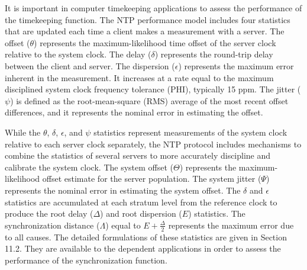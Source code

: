 It is important in computer timekeeping applications to assess the
performance of the timekeeping function. The NTP performance model
includes four statistics that are updated each time a client makes a
measurement with a server. The offset ($ \theta $) represents the
maximum-likelihood time offset of the server clock relative to the
system clock. The delay ($ \delta $) represents the round-trip delay
between the client and server. The dispersion ($ \epsilon $) represents
the maximum error inherent in the measurement. It increases at a
rate equal to the maximum disciplined system clock frequency
tolerance (PHI), typically 15 ppm. The jitter ($ \psi $) is defined as
the root-mean-square (RMS) average of the most recent offset
differences, and it represents the nominal error in estimating the
offset.

While the $ \theta $, $ \delta $, $ \epsilon $, and $ \psi $ statistics represent
measurements of the system clock relative to each server clock
separately, the NTP protocol includes mechanisms to combine the
statistics of several servers to more accurately discipline and
calibrate the system clock. The system offset ($ \Theta $) represents the
maximum-likelihood offset estimate for the server population. The
system jitter ($ \Psi $) represents the nominal error in estimating the
system offset. The $ \delta $ and $ \epsilon $ statistics are accumulated at
each stratum level from the reference clock to produce the root delay
($ \Delta $) and root dispersion ($ E $) statistics. The
synchronization distance ($ \Lambda $) equal to $ E + \frac{\Delta}{2} $
represents the maximum error due to all causes. The detailed
formulations of these statistics are given in Section 11.2. They are
available to the dependent applications in order to assess the
performance of the synchronization function.
